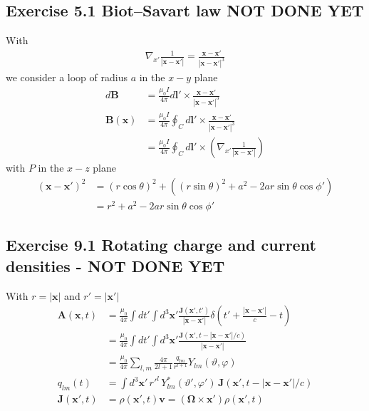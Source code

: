 \documentclass[../main.tex]{subfiles}
\begin{document}
\subsection{Exercise 5.1 Biot–Savart law NOT DONE YET}
With
\begin{align}
\nabla_{x'}\frac{1}{|\mathbf{x}-\mathbf{x'}|}
=\frac{\mathbf{x}-\mathbf{x'}}{|\mathbf{x}-\mathbf{x'}|^3}
\end{align}
we consider a loop of radius $a$ in the $x-y$ plane
\begin{align}
d\mathbf{B}&=\frac{\mu_0I}{4\pi}d\mathbf{l}'\times\frac{\mathbf{x}-\mathbf{x'}}{|\mathbf{x}-\mathbf{x'}|^3}\\
\mathbf{B}(\mathbf{x})
&=\frac{\mu_0I}{4\pi}\oint_{C}d\mathbf{l}'\times\frac{\mathbf{x}-\mathbf{x'}}{|\mathbf{x}-\mathbf{x'}|^3}\\
&=\frac{\mu_0I}{4\pi}\oint_{C}d\mathbf{l}'\times\left(\nabla_{x'}\frac{1}{|\mathbf{x}-\mathbf{x'}|}\right)
\end{align}
with $P$ in the $x-z$ plane
\begin{align}
(\mathbf{x}-\mathbf{x'})^2
&=(r\cos\theta)^2+((r\sin\theta)^2+a^2-2ar\sin\theta\cos\phi')\\
&=r^2+a^2-2ar\sin\theta\cos\phi'
\end{align}

\subsection{Exercise 9.1 Rotating charge and current densities - NOT DONE YET}
With $r=|\mathbf{x}|$ and $r'=|\mathbf{x}'|$
\begin{align}
\mathbf{A}(\mathbf{x},t)&=\frac{\mu_0}{4\pi}\int dt'\int d^3\mathbf{x}'\frac{\mathbf{J}(\mathbf{x}',t')}{|\mathbf{x}-\mathbf{x}'|}\delta\left(t'+\frac{|\mathbf{x}-\mathbf{x}'|}{c}-t\right)\\
&=\frac{\mu_0}{4\pi}\int dt'\int d^3\mathbf{x}'\frac{\mathbf{J}(\mathbf{x}',t-|\mathbf{x}-\mathbf{x}'|/c)}{|\mathbf{x}-\mathbf{x}'|}\\
&=\frac{\mu_0}{4\pi}\sum_{l,m}\frac{4\pi}{2l+1}\frac{q_{lm}}{r^{l+1}}Y_{lm}(\vartheta,\varphi)\\
q_{lm}(t)&=\int d^3\mathbf{x}'\,r'^l\,Y_{lm}^*(\vartheta',\varphi')\,\mathbf{J}(\mathbf{x}',t-|\mathbf{x}-\mathbf{x}'|/c)\\
\mathbf{J}(\mathbf{x}',t)&=\rho(\mathbf{x}',t)\mathbf{v}
=(\mathbf{\Omega}\times\mathbf{x'})\rho(\mathbf{x}',t)
\end{align}
\end{document}
